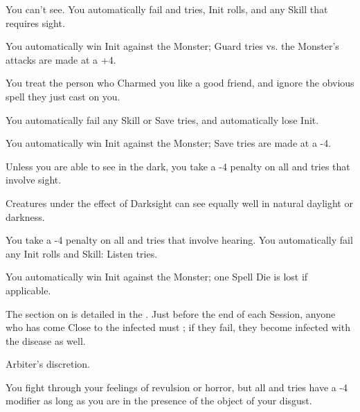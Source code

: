 \begin{multicols*}{2}

  You can't see. You automatically fail \RO and \RB tries, Init rolls, and any Skill that requires sight.

    You automatically win Init against the Monster; Guard tries vs. the Monster's attacks are made at a +4.


  You treat the person who Charmed you like a good friend, and ignore the obvious spell they just cast on you.


  You automatically fail any Skill or Save tries, and automatically lose Init.

   You automatically win Init against the Monster;  Save tries are made at a -4.


  Unless you are able to see in the dark, you take a -4 penalty on all \RO and \RB tries that involve sight.


  Creatures under the effect of Darksight can see equally well in natural daylight or darkness.


  You take a -4 penalty on all \RO and \RB tries that involve hearing.  You automatically fail any Init rolls and Skill: Listen tries.

    You automatically win Init against the Monster; one Spell Die is lost if applicable.




  The section on  is detailed in the . Just before the end of each Session, anyone who has come Close to the infected must \RSTRY{\VIG}; if they fail, they become infected with the disease as well.

  Arbiter's discretion.


  You fight through your feelings of revulsion or horror, but all \RO and \RB tries have a -4 modifier as long as you are in the presence of the object of your disgust.


\end{multicols*}
